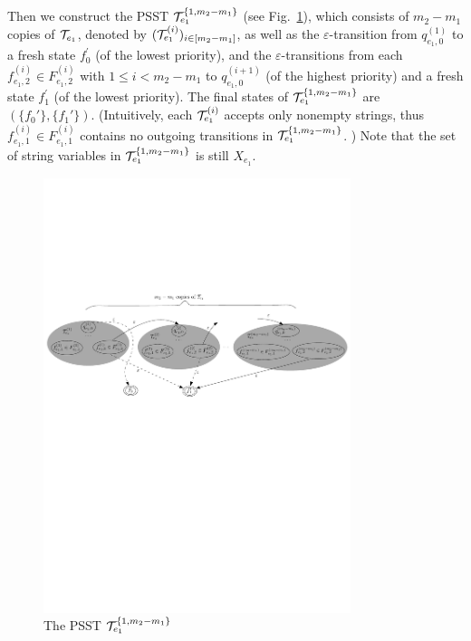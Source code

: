 Then we construct the PSST $\mathcal{T}^{\{1,m_2-m_1\}}_{e_1}$ (see Fig.~\ref{fig-reg2pfa-4}), which consists of $m_2-m_1$ copies of $\mathcal{T}_{e_1}$, denoted by $(\mathcal{T}^{(i)}_{e_1})_{i \in [m_2-m_1]}$, as well as the $\varepsilon$-transition from $q^{(1)}_{e_1,0}$ to a fresh state $f^\prime_0$ (of the lowest priority), and the $\varepsilon$-transitions from each $f^{(i)}_{e_1,2} \in F^{(i)}_{e_1,2}$ with $1\le i < m_2-m_1$ to $q^{(i+1)}_{e_1,0}$ (of the highest priority) and a fresh state $f^\prime_1$ (of the lowest priority). The final states of $\mathcal{T}^{\{1,m_2-m_1\}}_{e_1}$ are $(\{f_0'\},\{f_1'\})$. (Intuitively, each $\mathcal{T}^{(i)}_{e_1}$ accepts only nonempty strings, thus $f^{(i)}_{e_1,1} \in F^{(i)}_{e_1,1}$ contains no outgoing transitions in $\mathcal{T}^{\{1,m_2-m_1\}}_{e_1}$. ) Note that the set of string variables in $\mathcal{T}^{\{1,m_2-m_1\}}_{e_1}$ is still $X_{e_1}$.
%
\begin{figure}[tb]
	\vspace{-2mm}
	\centering
	\includegraphics[width = 0.8\textwidth]{reg2pfa-4.pdf}
	\caption{The PSST $\mathcal{T}^{\{1,m_2-m_1\}}_{e_1}$}
	\label{fig-reg2pfa-4}
	\vspace{-4mm}
\end{figure}  

